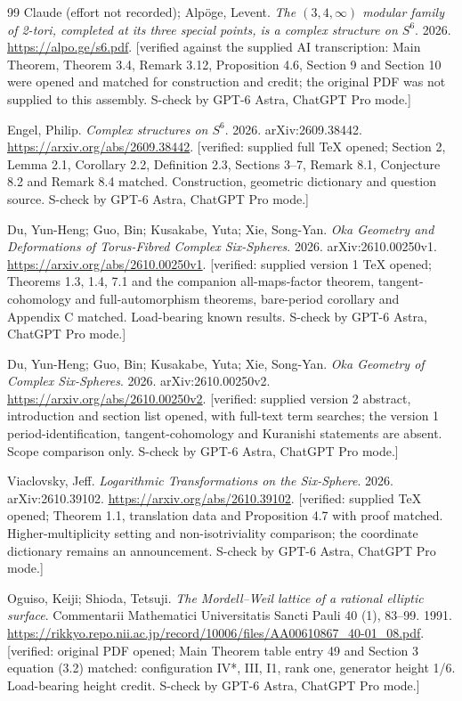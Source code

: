 \begin{thebibliography}{99}
{Claude (effort not recorded)}; Alp{\"o}ge, Levent. \emph{The $(3,4,\infty)$ modular family of 2-tori, completed at its three special points, is a complex structure on $S^6$}. 2026. \url{https://alpo.ge/s6.pdf}. [verified against the supplied AI transcription: Main Theorem, Theorem 3.4, Remark 3.12, Proposition 4.6, Section 9 and Section 10 were opened and matched for construction and credit; the original PDF was not supplied to this assembly. S-check by GPT-6 Astra, ChatGPT Pro mode.]

Engel, Philip. \emph{Complex structures on $S^6$}. 2026. arXiv:2609.38442. \url{https://arxiv.org/abs/2609.38442}. [verified: supplied full TeX opened; Section 2, Lemma 2.1, Corollary 2.2, Definition 2.3, Sections 3--7, Remark 8.1, Conjecture 8.2 and Remark 8.4 matched. Construction, geometric dictionary and question source. S-check by GPT-6 Astra, ChatGPT Pro mode.]

Du, Yun-Heng; Guo, Bin; Kusakabe, Yuta; Xie, Song-Yan. \emph{Oka Geometry and Deformations of Torus-Fibred Complex Six-Spheres}. 2026. arXiv:2610.00250v1. \url{https://arxiv.org/abs/2610.00250v1}. [verified: supplied version 1 TeX opened; Theorems 1.3, 1.4, 7.1 and the companion all-maps-factor theorem, tangent-cohomology and full-automorphism theorems, bare-period corollary and Appendix C matched. Load-bearing known results. S-check by GPT-6 Astra, ChatGPT Pro mode.]

Du, Yun-Heng; Guo, Bin; Kusakabe, Yuta; Xie, Song-Yan. \emph{Oka Geometry of Complex Six-Spheres}. 2026. arXiv:2610.00250v2. \url{https://arxiv.org/abs/2610.00250v2}. [verified: supplied version 2 abstract, introduction and section list opened, with full-text term searches; the version 1 period-identification, tangent-cohomology and Kuranishi statements are absent. Scope comparison only. S-check by GPT-6 Astra, ChatGPT Pro mode.]

Viaclovsky, Jeff. \emph{Logarithmic Transformations on the Six-Sphere}. 2026. arXiv:2610.39102. \url{https://arxiv.org/abs/2610.39102}. [verified: supplied TeX opened; Theorem 1.1, translation data and Proposition 4.7 with proof matched. Higher-multiplicity setting and non-isotriviality comparison; the coordinate dictionary remains an announcement. S-check by GPT-6 Astra, ChatGPT Pro mode.]

Oguiso, Keiji; Shioda, Tetsuji. \emph{The Mordell--Weil lattice of a rational elliptic surface}. Commentarii Mathematici Universitatis Sancti Pauli 40 (1), 83--99. 1991. \url{https://rikkyo.repo.nii.ac.jp/record/10006/files/AA00610867_40-01_08.pdf}. [verified: original PDF opened; Main Theorem table entry 49 and Section 3 equation (3.2) matched: configuration IV*, III, I1, rank one, generator height 1/6. Load-bearing height credit. S-check by GPT-6 Astra, ChatGPT Pro mode.]


\end{thebibliography}

